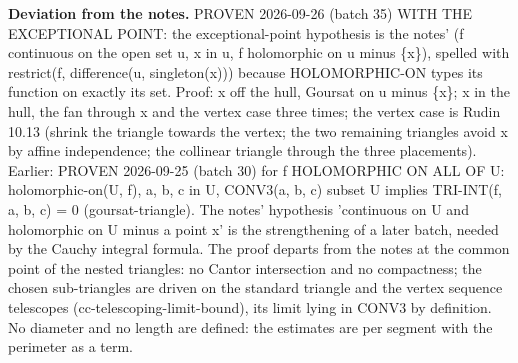 %
\noindent\textbf{Deviation from the notes.} PROVEN 2026-09-26 (batch 35) WITH THE EXCEPTIONAL POINT: the exceptional-point hypothesis is the notes' (f continuous on the open set u, x in u, f holomorphic on u minus \{x\}), spelled with restrict(f, difference(u, singleton(x))) because HOLOMORPHIC-ON types its function on exactly its set. Proof: x off the hull, Goursat on u minus \{x\}; x in the hull, the fan through x and the vertex case three times; the vertex case is Rudin 10.13 (shrink the triangle towards the vertex; the two remaining triangles avoid x by affine independence; the collinear triangle through the three placements). Earlier: PROVEN 2026-09-25 (batch 30) for f HOLOMORPHIC ON ALL OF U: holomorphic-on(U, f), a, b, c in U, CONV3(a, b, c) subset U implies TRI-INT(f, a, b, c) = 0 (goursat-triangle). The notes' hypothesis 'continuous on U and holomorphic on U minus a point x' is the strengthening of a later batch, needed by the Cauchy integral formula. The proof departs from the notes at the common point of the nested triangles: no Cantor intersection and no compactness; the chosen sub-triangles are driven on the standard triangle and the vertex sequence telescopes (cc-telescoping-limit-bound), its limit lying in CONV3 by definition. No diameter and no length are defined: the estimates are per segment with the perimeter as a term.
%
\renewcommand{\thethm}{3.7}
